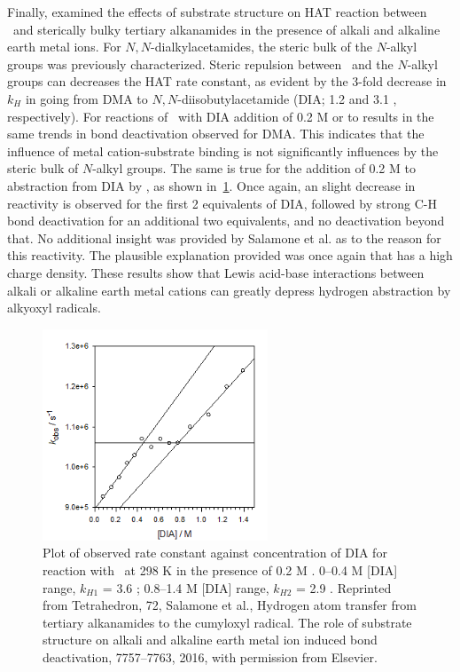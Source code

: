 Finally, \citet{Salamone2016} examined the effects of substrate structure on HAT reaction between \cumo\ and sterically bulky tertiary alkanamides in the presence of alkali and alkaline earth metal ions. For $N,N$-dialkylacetamides, the steric bulk of the $N$-alkyl groups was previously characterized.\cite{Salamone2014} Steric repulsion between \cumo\ and the $N$-alkyl groups can decreases the HAT rate constant, as evident by the 3-fold decrease in $k_H$ in going from DMA to $N,N$-diisobutylacetamide (DIA; 1.2 and 3.1 \Ms, respectively). For reactions of \cumo\ with DIA addition of 0.2 M  or  to results in the same trends in  bond deactivation observed for DMA. This indicates that the influence of metal cation-substrate binding is not significantly influences by the steric bulk of $N$-alkyl groups.  The same is true for the addition of 0.2 M  to abstraction from DIA by \cumo, as shown in~\ref{fig:k-dia-mg}. Once again, an slight decrease in reactivity is observed for the first 2 equivalents of DIA, followed by strong C-H bond deactivation for an additional two equivalents, and no deactivation beyond that. No additional insight was provided by Salamone et al. as to the reason for this reactivity. The plausible explanation provided was once again that  has a high charge density. These results show that Lewis acid-base interactions between alkali or alkaline earth metal cations can greatly depress hydrogen abstraction by alkyoxyl radicals.

\begin{figure}[!htbp]
  \includegraphics[width=0.6\textwidth]{figures/exptdia-mg.png}
  \caption[Plot of observed rate constant against concentration of DIA for reaction with \cumo\ at 298 K in the presence of 0.2 M .]
  {Plot of observed rate constant against concentration of DIA for reaction with \cumo\ at 298 K in the presence of 0.2 M . 0--0.4 M [DIA] range, $k_{H1}$ = 3.6 \Ms; 0.8--1.4 M [DIA] range, $k_{H2}$ = 2.9 \Ms.
  Reprinted from Tetrahedron, 72, Salamone et al., Hydrogen atom transfer from tertiary alkanamides to the cumyloxyl radical. The role of substrate structure on alkali and alkaline earth metal ion induced  bond deactivation, 7757--7763, 2016, with permission from Elsevier.}
  \label{fig:k-dia-mg}
\end{figure}

